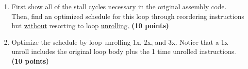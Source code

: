 \documentclass[a4paper, 11pt]{exam}
\begin{document}
\begin{enumerate}
\begin{enumerate}
	\item First show all of the stall cycles necessary in the original assembly code. Then, find an optimized schedule for this loop through reordering instructions but \underline{without} resorting to loop \underline{unrolling.} \textbf{(10 points)}
	
	\item Optimize the schedule by loop unrolling 1x, 2x, and 3x. Notice that a 1x unroll includes the original loop body plus the 1 time unrolled instructions. \textbf{(10 points)}


\end{enumerate}




\end{enumerate}
\end{document}
